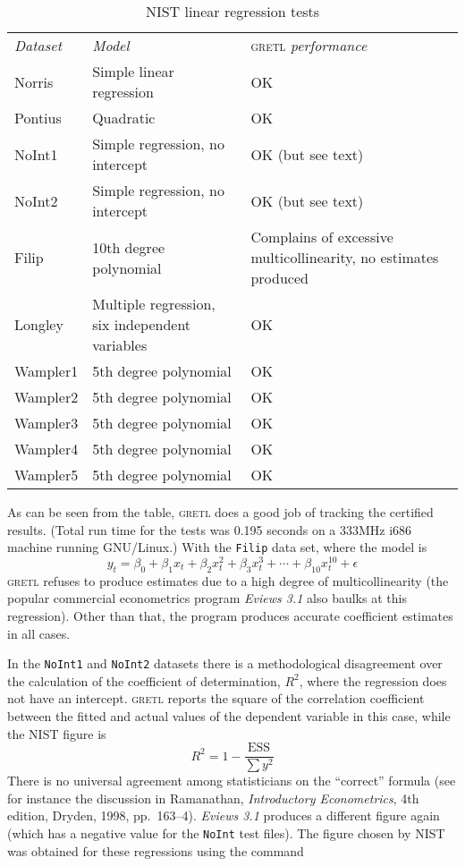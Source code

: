 \documentclass{article}
\begin{document}
\begin{table}[htbp]
\begin{center}
{\setlength{\extrarowheight}{6pt}
  \begin{tabular}{lp{2in}p{3in}}

\textit{Dataset} & \textit{Model} & \textsc{gretl} \textit{performance} \\
 Norris     &  Simple linear regression &  OK \\
 Pontius    &  Quadratic &  OK \\
 NoInt1     &  Simple regression, no intercept &  OK (but see text)  \\
 NoInt2     &  Simple regression, no intercept & OK (but see text) \\
 Filip      &  10th degree polynomial &  Complains of 
               excessive multicollinearity, no estimates produced \\
 Longley    &  Multiple regression, six independent variables &  OK \\
 Wampler1   &  5th degree polynomial &  OK \\
 Wampler2   &  5th degree polynomial &  OK \\
 Wampler3   &  5th degree polynomial &  OK \\
 Wampler4   &  5th degree polynomial &  OK \\
 Wampler5   &  5th degree polynomial &  OK \\
  \end{tabular}}
\caption{NIST linear regression tests}
\label{tab:linreg}
\end{center}
\end{table}

As can be seen from the table, \textsc{gretl} does a good job of
tracking the certified results. (Total run time for the tests was
0.195 seconds on a 333MHz i686 machine running GNU/Linux.)  With the
\texttt{Filip} data set, where the model is
$$y_t = \beta_0 + \beta_1 x_t + \beta_2 x^2_t + \beta_3 x^3_t + \cdots
+ \beta_{10} x^{10}_t + \epsilon$$
\textsc{gretl} refuses to produce
estimates due to a high degree of multicollinearity (the popular
commercial econometrics program \textit{Eviews 3.1} also baulks at
this regression).  Other than that, the program produces accurate
coefficient estimates in all cases.

In the \texttt{NoInt1} and \texttt{NoInt2} datasets there is a
methodological disagreement over the calculation of the coefficient of
determination, $R^2$, where the regression does not have an intercept.
\textsc{gretl} reports the square of the correlation coefficient
between the fitted and actual values of the dependent variable in this
case, while the NIST figure is
$$R^2 = 1 - \frac{\mathrm{ESS}}{\sum y^2}$$
There is no universal
agreement among statisticians on the ``correct'' formula (see for
instance the discussion in Ramanathan, \textit{Introductory
  Econometrics}, 4th edition, Dryden, 1998, pp.\ 163--4).
\textit{Eviews 3.1} produces a different figure again (which has a
negative value for the \texttt{NoInt} test files).  The figure chosen
by NIST was obtained for these regressions using the command
\end{document}
